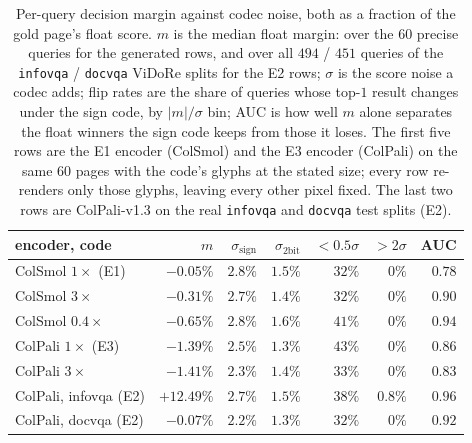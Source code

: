 \documentclass[conference]{IEEEtran}
\begin{document}
\begin{table}[!t]
\caption{Per-query decision margin against codec noise, both as a fraction of
the gold page's float score. $m$ is the median float margin: over the $60$
precise queries for the generated rows, and over all $494$ / $451$ queries of
the \texttt{infovqa} / \texttt{docvqa} ViDoRe splits for the E2 rows; $\sigma$
is the score noise a codec adds; flip rates are the share of queries whose
top-$1$ result changes under the sign code, by $|m|/\sigma$ bin; AUC is how
well $m$ alone separates the float winners the sign code keeps from those it
loses. The first five rows are the E1 encoder (ColSmol) and the E3 encoder
(ColPali) on the same $60$ pages with the code's glyphs at the stated size;
every row re-renders only those glyphs, leaving every other pixel fixed.
The last two rows are ColPali-v1.3 on the real \texttt{infovqa} and
\texttt{docvqa} test splits (E2).}
\label{tab:margin}
\centering
\footnotesize
\setlength{\tabcolsep}{3pt}
\begin{tabular}{@{}lrrrrrr@{}}
\toprule
encoder, code & $m$ & $\sigma_{\mathrm{sign}}$ & $\sigma_{\mathrm{2bit}}$ & $<0.5\sigma$ & $>2\sigma$ & AUC \\
\midrule
ColSmol $1\times$ (E1) & $-0.05\%$ & $2.8\%$ & $1.5\%$ & $32\%$ & $0\%$ & $0.78$ \\
ColSmol $3\times$ & $-0.31\%$ & $2.7\%$ & $1.4\%$ & $32\%$ & $0\%$ & $0.90$ \\
ColSmol $0.4\times$ & $-0.65\%$ & $2.8\%$ & $1.6\%$ & $41\%$ & $0\%$ & $0.94$ \\
ColPali $1\times$ (E3) & $-1.39\%$ & $2.5\%$ & $1.3\%$ & $43\%$ & $0\%$ & $0.86$ \\
ColPali $3\times$ & $-1.41\%$ & $2.3\%$ & $1.4\%$ & $33\%$ & $0\%$ & $0.83$ \\
\midrule
ColPali, infovqa (E2) & $+12.49\%$ & $2.7\%$ & $1.5\%$ & $38\%$ & $0.8\%$ & $0.96$ \\
ColPali, docvqa (E2) & $-0.07\%$ & $2.2\%$ & $1.3\%$ & $32\%$ & $0\%$ & $0.92$ \\
\bottomrule
\end{tabular}
\end{table}
\end{document}
